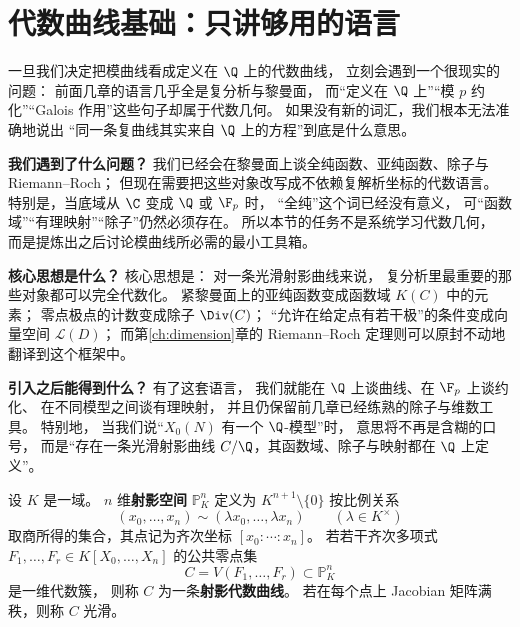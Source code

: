 \section{代数曲线基础：只讲够用的语言}
\label{sec:ch07-algebraic-varieties}

一旦我们决定把模曲线看成定义在 $\Q$ 上的代数曲线，
立刻会遇到一个很现实的问题：
前面几章的语言几乎全是复分析与黎曼面，
而“定义在 $\Q$ 上”“模 $p$ 约化”“Galois 作用”这些句子却属于代数几何。
如果没有新的词汇，我们根本无法准确地说出
“同一条复曲线其实来自 $\Q$ 上的方程”到底是什么意思。

\textbf{我们遇到了什么问题？}
我们已经会在黎曼面上谈全纯函数、亚纯函数、除子与 Riemann--Roch；
但现在需要把这些对象改写成不依赖复解析坐标的代数语言。
特别是，当底域从 $\C$ 变成 $\Q$ 或 $\F_p$ 时，
“全纯”这个词已经没有意义，
可“函数域”“有理映射”“除子”仍然必须存在。
所以本节的任务不是系统学习代数几何，
而是提炼出之后讨论模曲线所必需的最小工具箱。

\textbf{核心思想是什么？}
核心思想是：
对一条光滑射影曲线来说，
复分析里最重要的那些对象都可以完全代数化。
紧黎曼面上的亚纯函数变成函数域 $K(C)$ 中的元素；
零点极点的计数变成除子 $\Div(C)$；
“允许在给定点有若干极”的条件变成向量空间 $\mathcal L(D)$；
而第\ref{ch:dimension}章的 Riemann--Roch 定理则可以原封不动地翻译到这个框架中。

\textbf{引入之后能得到什么？}
有了这套语言，
我们就能在 $\Q$ 上谈曲线、在 $\F_p$ 上谈约化、
在不同模型之间谈有理映射，
并且仍保留前几章已经练熟的除子与维数工具。
特别地，
当我们说“$X_0(N)$ 有一个 $\Q$-模型”时，
意思将不再是含糊的口号，
而是“存在一条光滑射影曲线 $C/\Q$，其函数域、除子与映射都在 $\Q$ 上定义”。



\begin{definition}[射影空间与射影曲线]
\label{def:ch07-projective-curve}
设 $K$ 是一域。
$n$ 维\textbf{射影空间} $\mathbb P^n_K$ 定义为
$K^{n+1}\setminus\{0\}$ 按比例关系
\[
  (x_0,\dots,x_n)\sim (\lambda x_0,\dots,\lambda x_n)\qquad (\lambda\in K^\times)
\]
取商所得的集合，其点记为齐次坐标 $[x_0:\cdots:x_n]$。
若若干齐次多项式 $F_1,\dots,F_r\in K[X_0,\dots,X_n]$ 的公共零点集
\[
  C=V(F_1,\dots,F_r)\subset \mathbb P^n_K
\]
是一维代数簇，
则称 $C$ 为一条\textbf{射影代数曲线}。
若在每个点上 Jacobian 矩阵满秩，则称 $C$ 光滑。
\end{definition}

